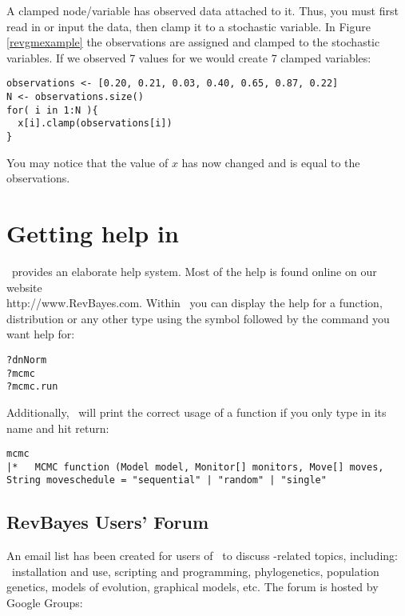 A clamped node/variable has observed data attached to it. 
Thus, you must first read in or input the data, then clamp it to a stochastic variable. 
In Figure \ref{revgmexample} the observations are assigned and clamped to the stochastic variables.
If we observed 7 values for  we would create 7 clamped variables:
{\tt \begin{snugshade*}
\begin{lstlisting}
observations <- [0.20, 0.21, 0.03, 0.40, 0.65, 0.87, 0.22]
N <- observations.size()
for( i in 1:N ){
  x[i].clamp(observations[i])
}
\end{lstlisting}
\end{snugshade*}}
You may notice that the value of $x$ has now changed and is equal to the observations.



\section{Getting help in \RevBayes}

\RevBayes~provides an elaborate help system. 
Most of the help is found online on our website \\
http://www.RevBayes.com.
Within \RevBayes~you can display the help for a function, distribution or any other type using the  symbol followed by the command you want help for:
{\tt \begin{snugshade*}
\begin{lstlisting}
?dnNorm
?mcmc
?mcmc.run
\end{lstlisting}
\end{snugshade*}}

Additionally, \RevBayes~will print the correct usage of a function if you only type in its name and hit return:
{\tt \small \begin{snugshade*}
\begin{lstlisting}
mcmc
|*   MCMC function (Model model, Monitor[] monitors, Move[] moves, String moveschedule = "sequential" | "random" | "single"
\end{lstlisting}
\end{snugshade*}}


\bigskip
\subsection{RevBayes Users' Forum}

An email list has been created for users of \RevBayes~to discuss \RevBayes-related topics, including: \RevBayes~installation and use, scripting and programming, phylogenetics, population genetics, models of evolution, graphical models, etc. The forum is hosted by Google Groups:






